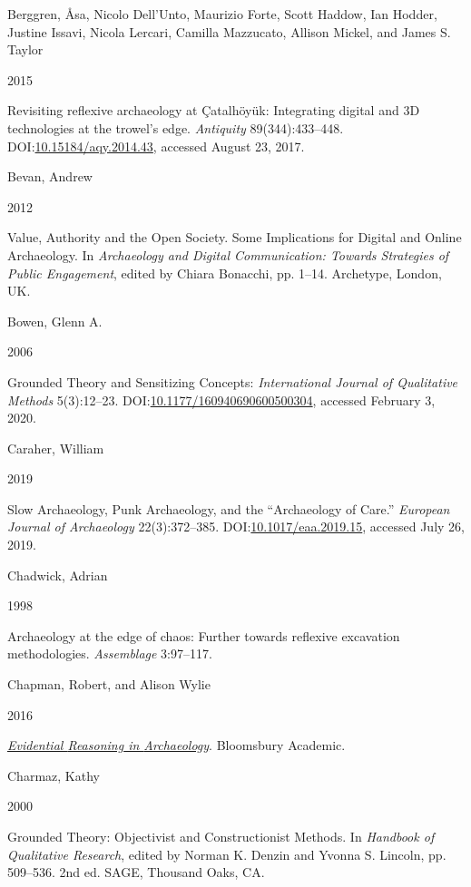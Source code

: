 \documentclass[
]{article}
\newlength{\cslhangindent}
\newlength{\csllabelwidth}
\newenvironment{CSLReferences}[2] %
 {\begin{list}{}{%
  \setlength{\itemindent}{0pt}
  \setlength{\leftmargin}{0pt}
  \setlength{\parsep}{0pt}
  \ifodd #1
   \setlength{\leftmargin}{\cslhangindent}
   \setlength{\itemindent}{-1\cslhangindent}
  \fi
  \setlength{\itemsep}{#2\baselineskip}}}
 {\end{list}}
\newcommand{\CSLBlock}[1]{\hfill\break\parbox[t]{\linewidth}{\strut\ignorespaces#1\strut}}
\newcommand{\CSLLeftMargin}[1]{\parbox[t]{\csllabelwidth}{\strut#1\strut}}
\newcommand{\CSLRightInline}[1]{\parbox[t]{\linewidth - \csllabelwidth}{\strut#1\strut}}
\begin{document}
\begin{CSLReferences}{0}{1}
\CSLBlock{Berggren, Åsa, Nicolo Dell'Unto, Maurizio Forte, Scott Haddow,
Ian Hodder, Justine Issavi, Nicola Lercari, Camilla Mazzucato, Allison
Mickel, and James S. Taylor}
\CSLLeftMargin{ 2015}%
\CSLRightInline{Revisiting reflexive archaeology at {Çatalhöyük}:
{Integrating} digital and {3D} technologies at the trowel's edge.
\emph{Antiquity} 89(344):433--448.
DOI:\href{https://doi.org/10.15184/aqy.2014.43}{10.15184/aqy.2014.43},
accessed August 23, 2017.}

\CSLBlock{Bevan, Andrew}
\CSLLeftMargin{ 2012}%
\CSLRightInline{Value, {Authority} and the {Open Society}. {Some
Implications} for {Digital} and {Online Archaeology}. In
\emph{Archaeology and {Digital Communication}: {Towards Strategies} of
{Public Engagement}}, edited by Chiara Bonacchi, pp. 1--14. Archetype,
London, UK.}

\CSLBlock{Bowen, Glenn A.}
\CSLLeftMargin{ 2006}%
\CSLRightInline{Grounded {Theory} and {Sensitizing Concepts}:
\emph{International Journal of Qualitative Methods} 5(3):12--23.
DOI:\href{https://doi.org/10.1177/160940690600500304}{10.1177/160940690600500304},
accessed February 3, 2020.}

\CSLBlock{Caraher, William}
\CSLLeftMargin{ 2019}%
\CSLRightInline{Slow {Archaeology}, {Punk Archaeology}, and the
{``{Archaeology} of {Care}.''} \emph{European Journal of Archaeology}
22(3):372--385.
DOI:\href{https://doi.org/10.1017/eaa.2019.15}{10.1017/eaa.2019.15},
accessed July 26, 2019.}

\CSLBlock{Chadwick, Adrian}
\CSLLeftMargin{ 1998}%
\CSLRightInline{Archaeology at the edge of chaos: Further towards
reflexive excavation methodologies. \emph{Assemblage} 3:97--117.}

\CSLBlock{Chapman, Robert, and Alison Wylie}
\CSLLeftMargin{ 2016}%
\CSLRightInline{\emph{\href{https://books.google.com?id=tMohDQAAQBAJ}{Evidential
{Reasoning} in {Archaeology}}}. Bloomsbury Academic.}

\CSLBlock{Charmaz, Kathy}
\CSLLeftMargin{ 2000}%
\CSLRightInline{Grounded {Theory}: {Objectivist} and {Constructionist
Methods}. In \emph{Handbook of {Qualitative Research}}, edited by Norman
K. Denzin and Yvonna S. Lincoln, pp. 509--536. 2nd ed. SAGE, Thousand
Oaks, CA.}


\end{CSLReferences}
\end{document}
